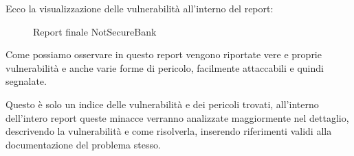 Ecco la visualizzazione delle vulnerabilità all’interno del report:
\begin{figure}[H]
    \caption{Report finale NotSecureBank }
    \label{fig:reportNSB}
\end{figure}
Come possiamo osservare in questo report vengono riportate vere e proprie vulnerabilità e anche varie forme di pericolo, facilmente attaccabili e quindi segnalate.

Questo è solo un indice delle vulnerabilità e dei pericoli trovati, all’interno dell’intero report queste minacce verranno analizzate maggiormente nel dettaglio, descrivendo la vulnerabilità e come risolverla, inserendo riferimenti validi alla documentazione del problema stesso.

